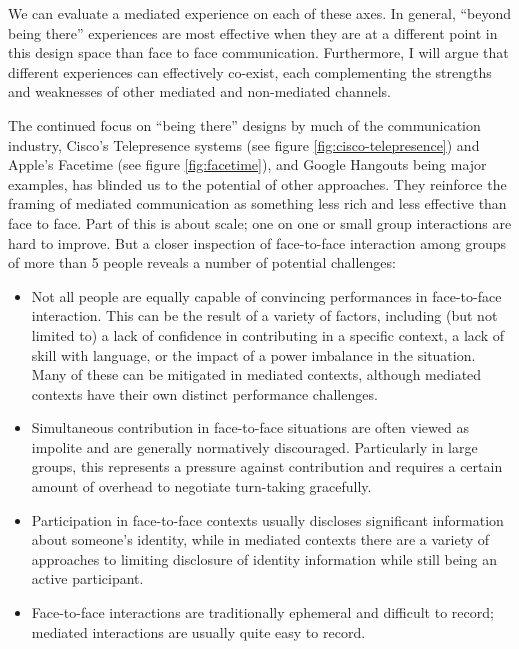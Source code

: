 We can evaluate a mediated experience on each of these axes. In general, ``beyond being there'' experiences are most effective when they are at a different point in this design space than face to face communication. Furthermore, I will argue that different experiences can effectively co-exist, each complementing the strengths and weaknesses of other mediated and non-mediated channels.

The continued focus on ``being there'' designs by much of the communication industry, Cisco's Telepresence systems (see figure \ref{fig:cisco-telepresence}) and Apple's Facetime (see figure \ref{fig:facetime}), and Google Hangouts being major examples, has blinded us to the potential of other approaches. They reinforce the framing of mediated communication as something less rich and less effective than face to face. Part of this is about scale; one on one or small group interactions are hard to improve. But a closer inspection of face-to-face interaction among groups of more than 5 people reveals a number of potential challenges:


\begin{itemize}
\item Not all people are equally capable of convincing performances in face-to-face interaction. This can be the result of a variety of factors, including (but not limited to) a lack of confidence in contributing in a specific context, a lack of skill with language, or the impact of a power imbalance in the situation. Many of these can be mitigated in mediated contexts\citep{Siegel:1986ve}, although mediated contexts have their own distinct performance challenges.
\item Simultaneous contribution in face-to-face situations are often viewed as impolite and are generally normatively discouraged. Particularly in large groups, this represents a pressure against contribution and requires a certain amount of overhead to negotiate turn-taking gracefully.
\item Participation in face-to-face contexts usually discloses significant information about someone's identity, while in mediated contexts there are a variety of approaches to limiting disclosure of identity information while still being an active participant.
\item Face-to-face interactions are traditionally ephemeral and difficult to record; mediated interactions are usually quite easy to record. 
\end{itemize}


